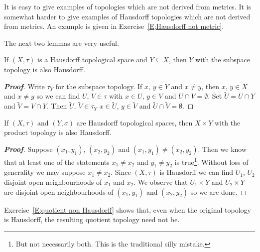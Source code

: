 It is easy to give examples of topologies which are not 
derived from metrics. It is somewhat harder to give examples
of Hausdorff topologies which are not derived from metrics.
An example is given in Exercise~\ref{E;Hausdorff not metric}.

The next two lemmas are very useful.

\begin{lemma}\label{L;inherit Hausdoff subspace}
If $(X,\tau)$ is a Hausdorff topological space
and $Y\subseteq X$, then $Y$ with the subspace topology
is also Hausdorff.
\end{lemma}
\begin{proof}[\bf Proof] Write $\tau_{Y}$ for the subspace topology.
If $x,\,y\in Y$ and $x\neq y$, then $x,\,y\in X$ and $x\neq y$ so we can find $U,\,V\in\tau$ with $x\in U$, $y\in V$ and $U\cap V=\emptyset$. Set $\tilde{U}=U\cap Y$ and $\tilde{V}=V\cap Y$. Then $\tilde{U},\,\tilde{V}\in\tau_{Y}$ $x\in \tilde{U}$, $y\in \tilde{V}$ and $\tilde{U}\cap\tilde{V}=\emptyset$.
\end{proof}



\begin{lemma}\label{L;inherit Hausdoff product}
If $(X,\tau)$ and $(Y,\sigma)$ are Hausdorff topological spaces,
then $X\times Y$ with the product topology
is also Hausdorff.
\end{lemma}
\begin{proof}[\bf Proof] Suppose $(x_{1},y_{1}),\,(x_{2},y_{2})$
and $(x_{1},y_{1})\neq(x_{2},y_{2})$. Then we know that at least
one of the statements $x_{1}\neq x_{2}$ and $y_{1}\neq y_{2}$
is true\footnote{But not necessarily both. This is the traditional
silly mistake.}. Without loss of generality we may suppose
$x_{1}\neq x_{2}$. Since $(X,\tau)$ is Hausdorff we can find
$U_{1},\,U_{2}$ disjoint open neighbourhoods of $x_{1}$ and $x_{2}$.
We observe that  $U_{1}\times Y$ and $U_{2}\times Y$ 
are disjoint open neighbourhoods of $(x_{1},y_{1})$
and $(x_{2},y_{2})$ so we are done.
\end{proof}


Exercise~\ref{E;quotient non Hausdorff} shows that, even when
the original topology is Hausdorff, the resulting quotient 
topology need not be.
















